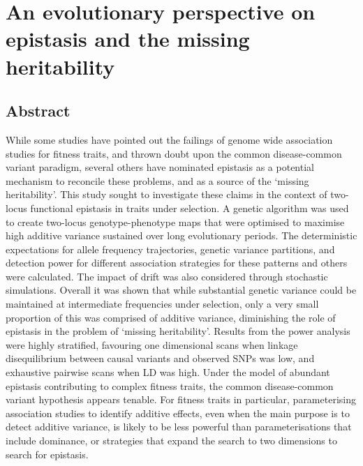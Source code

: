 
\chapter{An evolutionary perspective on epistasis and the missing heritability}
\label{Results1}
\section{Abstract}

While some studies have pointed out the failings of genome wide association studies for fitness traits, and thrown doubt upon the common disease-common variant paradigm, several others have nominated epistasis as a potential mechanism to reconcile these problems, and as a source of the `missing heritability'. This study sought to investigate these claims in the context of two-locus functional epistasis in traits under selection. A genetic algorithm was used to create two-locus genotype-phenotype maps that were optimised to maximise high additive variance sustained over long evolutionary periods. The deterministic expectations for allele frequency trajectories, genetic variance partitions, and detection power for different association strategies for these patterns and others were calculated. The impact of drift was also considered through stochastic simulations. Overall it was shown that while substantial genetic variance could be maintained at intermediate frequencies under selection, only a very small proportion of this was comprised of additive variance, diminishing the role of epistasis in the problem of `missing heritability'. Results from the power analysis were highly stratified, favouring one dimensional scans when linkage disequilibrium between causal variants and observed SNPs was low, and exhaustive pairwise scans when LD was high. Under the model of abundant epistasis contributing to complex fitness traits, the common disease-common variant hypothesis appears tenable. For fitness traits in particular, parameterising association studies to identify additive effects, even when the main purpose is to detect additive variance, is likely to be less powerful than parameterisations that include dominance, or strategies that expand the search to two dimensions to search for epistasis.

